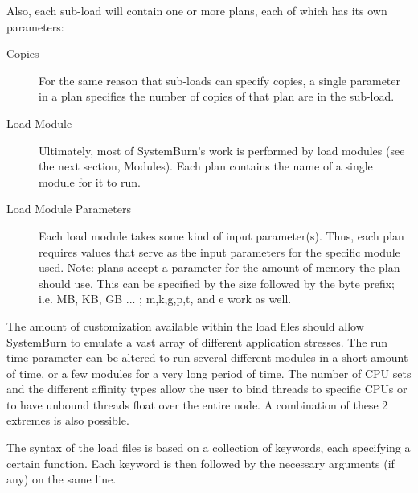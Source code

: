 Also, each sub-load will contain one or more plans, each of which has its own parameters:

\begin{description}
	\item [Copies] For the same reason that sub-loads can specify
	copies, a single parameter in a plan specifies the number of
	copies of that plan are in the sub-load.
	\item [Load Module] Ultimately, most of SystemBurn's work is
	performed by load modules (see the next section, Modules). Each
	plan contains the name of a single module for it to run.
	\item [Load Module Parameters] Each load module takes some kind
	of input parameter(s). Thus, each plan requires values that
	serve as the input parameters for the specific module used.
	Note: plans accept a parameter for the amount of memory the 
	plan should use. This can be specified by the size followed by
	the byte prefix; i.e. MB, KB, GB ... ; m,k,g,p,t, and e work as well.

\end{description}

The amount of customization available within the load files should allow
SystemBurn to emulate a vast array of different application stresses. The
run time parameter can be altered to run several different modules
in a short amount of time, or a few modules for a very long period of
time. The number of CPU sets and the different affinity types allow the
user to bind threads to specific CPUs or to have unbound threads float
over the entire node. A combination of these 2 extremes is also possible.

The syntax of the load files is based on a collection of keywords,
each specifying a certain function. Each keyword is then followed by
the necessary arguments (if any) on the same line.

